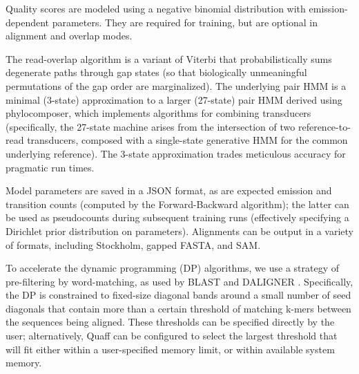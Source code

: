 \documentclass{bioinfo}
\begin{document}
\begin{methods}
Quality scores are modeled using a negative binomial distribution with emission-dependent parameters. They are required for training, but are optional in alignment and overlap modes.

The read-overlap algorithm is a variant of Viterbi that probabilistically sums degenerate paths through gap states (so that biologically unmeaningful permutations of the gap order are marginalized). The underlying pair HMM is a minimal (3-state) approximation to a larger (27-state) pair HMM derived using phylocomposer, which implements algorithms for combining transducers (specifically, the 27-state machine arises from the intersection of two reference-to-read transducers, composed with a single-state generative HMM for the common underlying reference). The 3-state approximation trades meticulous accuracy for pragmatic run times.

Model parameters are saved in a JSON format, as are expected emission and transition counts (computed by the Forward-Backward algorithm); the latter can be used as pseudocounts during subsequent training runs (effectively specifying a Dirichlet prior distribution on parameters). Alignments can be output in a variety of formats, including Stockholm, gapped FASTA, and SAM.

To accelerate the dynamic programming (DP) algorithms, we use a strategy of pre-filtering by word-matching, as used by BLAST \citep{Altschul1990-bc} and DALIGNER \citep{Myers2014-em}. Specifically, the DP is constrained to fixed-size diagonal bands around a small number of seed diagonals that contain more than a certain threshold of matching k-mers between the sequences being aligned. These thresholds can be specified directly by the user; alternatively, Quaff can be configured to select the largest threshold that will fit either within a user-specified memory limit, or within available system memory.


\end{methods}
\end{document}
